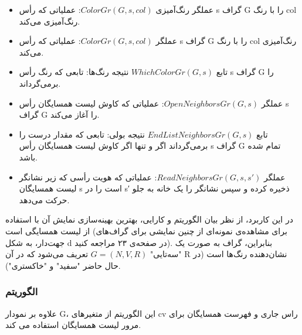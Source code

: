 \documentclass{book} %
\begin{document}
\begin{itemize}
    \item عملگر رنگ‌آمیزی‌ $ColorGr(G, s, col)$: عملیاتی که رأس s گراف G را با رنگ col رنگ‌آمیزی می‌کند.
   
    \item عملگر $ColorGr(G, s, col)$: عملیاتی که رأس s گراف G را با رنگ col رنگ‌آمیزی می‌کند.
    \item تابع $WhichColorGr(G, s)$ نتیجه رنگ‌ها: تابعی که رنگ رأس s گراف G را برمی‌گرداند.
    \item عملگر $OpenNeighborsGr(G, s)$: عملیاتی که کاوش لیست همسایگان رأس s گراف G را آغاز می‌کند.
    \item تابع $EndListNeighborsGr(G, s)$ نتیجه بولی: تابعی که مقدار درست را برمی‌گرداند اگر و تنها اگر کاوش لیست همسایگان رأس s گراف G تمام شده باشد.
    \item عملگر $ReadNeighborsGr(G, s, s′)$: عملیاتی که هویت رأسی که زیر نشانگر لیست همسایگان s است را در s′ ذخیره کرده و سپس نشانگر را یک خانه به جلو حرکت می‌دهد.
    
\end{itemize}

در این کاربرد، از نظر بیان الگوریتم و کارایی، بهترین بهینه‌سازی نمایش آن با استفاده از لیست همسایگی است (برای مشاهده‌ی نمونه‌ای از چنین نمایشی برای گراف‌های جهت‌دار، به شکل d در صفحه‌ی ۲۳ مراجعه کنید). بنابراین، گراف به صورت یک "سه‌تایی" $G = (N, V, R)$ تعریف می‌شود که در آن R نشان‌دهنده رنگ‌ها است (در حال حاضر "سفید" و "خاکستری").

\subsubsection*{الگوریتم}

علاوه بر نمودار G، این الگوریتم از متغیرهای cv راس جاری و فهرست همسایگان برای مرور لیست همسایگان استفاده می کند.
\end{document}
